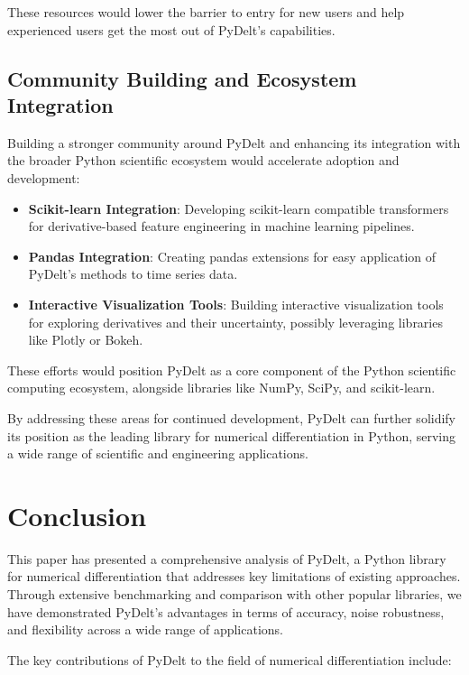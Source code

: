 \documentclass[11pt,a4paper]{article}
\begin{document}
These resources would lower the barrier to entry for new users and help experienced users get the most out of PyDelt's capabilities.

\subsection{Community Building and Ecosystem Integration}

Building a stronger community around PyDelt and enhancing its integration with the broader Python scientific ecosystem would accelerate adoption and development:

\begin{itemize}
    \item \textbf{Scikit-learn Integration}: Developing scikit-learn compatible transformers for derivative-based feature engineering in machine learning pipelines.
    
    \item \textbf{Pandas Integration}: Creating pandas extensions for easy application of PyDelt's methods to time series data.
    
    \item \textbf{Interactive Visualization Tools}: Building interactive visualization tools for exploring derivatives and their uncertainty, possibly leveraging libraries like Plotly or Bokeh.
\end{itemize}

These efforts would position PyDelt as a core component of the Python scientific computing ecosystem, alongside libraries like NumPy, SciPy, and scikit-learn.

By addressing these areas for continued development, PyDelt can further solidify its position as the leading library for numerical differentiation in Python, serving a wide range of scientific and engineering applications.

\section{Conclusion}

This paper has presented a comprehensive analysis of PyDelt, a Python library for numerical differentiation that addresses key limitations of existing approaches. Through extensive benchmarking and comparison with other popular libraries, we have demonstrated PyDelt's advantages in terms of accuracy, noise robustness, and flexibility across a wide range of applications.

The key contributions of PyDelt to the field of numerical differentiation include:
\end{document}

